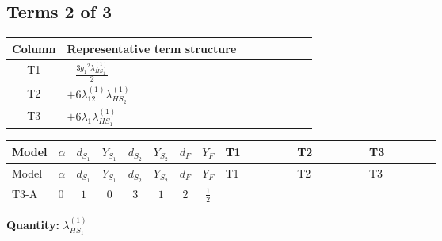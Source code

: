 \documentclass[8pt]{article}
\begin{document}
\begin{landscape}
\subsection*{Terms 2 of 3}
\begin{center}
\begin{tabular}{@{}c >{\raggedright\arraybackslash}p{0.82\linewidth}@{}}
\toprule
Column & Representative term structure \\
\midrule
T1 & \(\displaystyle -\frac{3 {g_1}^2 {\lambda_{HS_1}^{(1)}}}{2}\) \\
\midrule
T2 & \(\displaystyle +6 {\lambda_{12}^{(1)}} {\lambda_{HS_2}^{(1)}}\) \\
\midrule
T3 & \(\displaystyle +6 {\lambda_1} {\lambda_{HS_1}^{(1)}}\) \\
\midrule
\bottomrule
\end{tabular}
\end{center}
\smallskip
\tiny
\begin{longtable}{@{}llcccccc >{\raggedright\arraybackslash}p{0.21\linewidth} >{\raggedright\arraybackslash}p{0.21\linewidth} >{\raggedright\arraybackslash}p{0.21\linewidth}@{}}
\toprule
Model & $\alpha$ & $d_{S_1}$ & $Y_{S_1}$ & $d_{S_2}$ & $Y_{S_2}$ & $d_F$ & $Y_F$ & T1 & T2 & T3 \\
\midrule
\endfirsthead
\toprule
Model & $\alpha$ & $d_{S_1}$ & $Y_{S_1}$ & $d_{S_2}$ & $Y_{S_2}$ & $d_F$ & $Y_F$ & T1 & T2 & T3 \\
\midrule
\endhead
T3-A & $0$ & $1$ & $0$ & $3$ & $1$ & $2$ & $\frac{1}{2}$ & \scriptsize\adjustbox{max width=\linewidth}{$\begin{gathered} -\frac{3 {g_1}^2 {\lambda_{HS_1}^{(1)}}}{2}\end{gathered}$} & \scriptsize\adjustbox{max width=\linewidth}{$\begin{gathered} +6 {\lambda_{12}^{(1)}} {\lambda_{HS_2}^{(1)}}\end{gathered}$} & \scriptsize\adjustbox{max width=\linewidth}{$\begin{gathered} +6 {\lambda_1} {\lambda_{HS_1}^{(1)}}\end{gathered}$} \\
\midrule
\bottomrule
\end{longtable}
\clearpage
\noindent\textbf{Quantity: }$\lambda_{HS_1}^{(1)}$\par\smallskip

\end{landscape}
\end{document}
